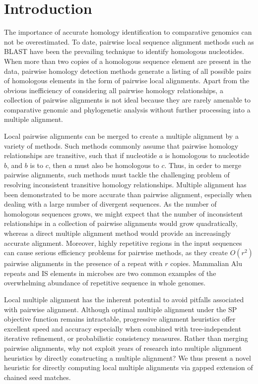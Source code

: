 \documentclass{llncs}
\begin{document}

\section{Introduction}
The importance of accurate homology identification to comparative
genomics can not be overestimated\cite{Kumar07}. To date, pairwise
local sequence alignment
methods such as BLAST\cite{ref-blastz,ref-ssearch,ref-pattern} have been the
prevailing technique to identify homologous nucleotides.  When more
than two copies of a homologous sequence element are present in the
data, pairwise homology detection methods generate a listing of all
possible pairs of homologous elements in the form of pairwise local
alignments.  Apart from the obvious inefficiency of considering all
pairwise homology relationships, a collection of pairwise alignments
is not ideal because they are rarely amenable to comparative genomic
and phylogenetic analysis without further processing into a multiple
alignment.

Local pairwise alignments can be merged to create a multiple alignment
by a variety of
methods\cite{ref-tba,ref-aba,ref-dialign,ref-related1}. Such methods
commonly assume that pairwise homology relationships are transitive,
such that if nucleotide $a$ is homologous to nucleotide $b$, and $b$
is to $c$, then $a$ must also be homologous to $c$.  Thus, in order to
merge pairwise alignments, such methods must tackle the challenging
problem of resolving inconsistent transitive homology relationships.
Multiple alignment has been demonstrated to be more accurate than
pairwise alignment, especially when dealing with a large number of
divergent sequences\cite{ref-mlagan,ref-aubergene}.  As the number of
homologous sequences grows, we might expect that the number of
inconsistent relationships in a collection of pairwise alignments
would grow quadratically, whereas a direct multiple alignment method
would provide an increasingly accurate alignment.  Moreover, highly
repetitive regions in the input sequences can cause serious efficiency
problems for pairwise methods, as they create $O(r^{2})$ pairwise
alignments in the presence of a repeat with $r$ copies.  Mammalian Alu
repeats and IS elements in microbes are two common examples of the
overwhelming abundance of repetitive sequence in whole genomes.

Local multiple alignment has the inherent potential to avoid pitfalls
associated with pairwise alignment. Although optimal multiple
alignment under the SP objective function remains
intractable\cite{ref-wangjiang}, progressive alignment heuristics
offer excellent speed and accuracy\cite{ref-clustalw,ref-tcoffee}
especially when combined with tree-independent iterative
refinement\cite{ref-muscle}, or probabilistic consistency
measures\cite{ref-probcons}. Rather than merging pairwise alignments,
why not exploit years of research into multiple alignment heuristics
by directly constructing a multiple alignment? We thus present a novel
heuristic for directly computing local multiple alignments via gapped
extension of chained seed matches.
\end{document}
